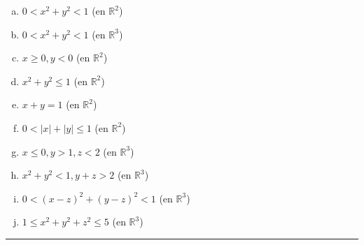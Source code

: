\documentclass{article}
\renewcommand{\Bbb}{\mathbb}
\begin{document}
\begin{enumerate}[(a)]
\bfseries
\item $0 < x^2 + y^2 < 1$ (en $\Bbb R^2$)

\item $0 < x^2 + y^2 < 1$ (en $\Bbb R^3$)

\item $x \geq 0, y < 0$ (en $\Bbb R^2$)

\item $x^2 + y^2 \leq 1$ (en $\Bbb R^2$)

\item $x + y = 1$ (en $\Bbb R^2$)

\item $0 < |x| + |y| \leq 1$ (en $\Bbb R^2$)

\item $x \leq 0, y > 1, z<2$ (en $\Bbb R^3$)

\item $x^2 + y^2 <1, y + z > 2$ (en $\Bbb R^3$)

\item $0 < (x-z)^2 + (y-z)^2 < 1$ (en $\Bbb R^3$)

\item $1 \leq x^2 + y^2 + z^2 \leq 5$ (en $\Bbb R^3$)
\end{enumerate}
\hrule
\end{document}
